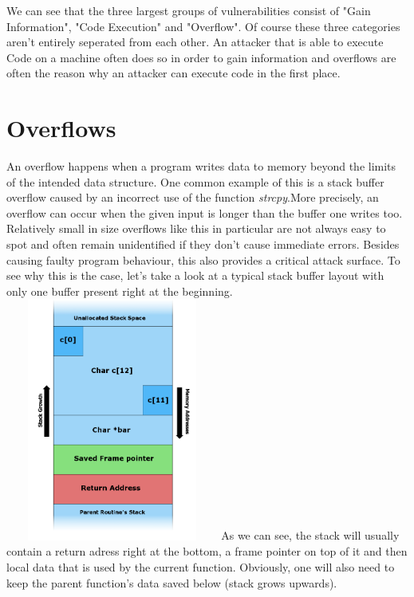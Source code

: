 \documentclass[10pt,twocolumn,a4paper]{article}
\begin{document}
We can see that the three largest groups of vulnerabilities consist of "Gain Information", "Code Execution" and "Overflow".
Of course these three categories aren't entirely seperated from each other.
An attacker that is able to execute Code on a machine often does so in order to gain information and overflows are often the reason why an attacker can execute code in the first place.
\section{Overflows}\label{sec:Overflows}
An overflow happens when a program writes data to memory beyond the limits of the intended data structure.
One common example of this is a stack buffer overflow caused by an incorrect use of the function \emph{strcpy}.More precisely, an overflow can occur when the given input is longer than the buffer one writes too.
Relatively small in size overflows like this in particular are not always easy to spot and often remain unidentified if they don't cause immediate errors.
Besides causing faulty program behaviour, this also provides a critical attack surface.
To see why this is the case, let's take a look at a typical stack buffer layout with only one buffer present right at the beginning.
\includegraphics[height=8cm,width=7cm]{fig/Stack_Overflow}
\newline As we can see, the stack will usually contain a return adress right at the bottom, a frame pointer on top of it and then local data that is used by the current function. Obviously, one will also need to keep the parent function's data saved below (stack grows upwards).
\end{document}
